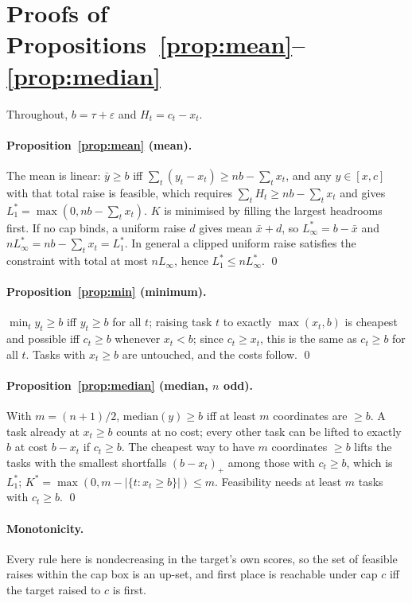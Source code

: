 \section{Proofs of Propositions~\ref{prop:mean}--\ref{prop:median}}
\label{app:proofs}

Throughout, $b=\tau+\varepsilon$ and $H_t=c_t-x_t$.

\paragraph{Proposition~\ref{prop:mean} (mean).} The mean is linear: $\bar y\ge b$ iff $\sum_t(y_t-x_t)\ge nb-\sum_tx_t$, and any $y\in[x,c]$ with that total raise is feasible, which requires $\sum_tH_t\ge nb-\sum_tx_t$ and gives $L_1^\ast=\max(0,nb-\sum_tx_t)$. $K$ is minimised by filling the largest headrooms first. If no cap binds, a uniform raise $d$ gives mean $\bar x+d$, so $L_\infty^\ast=b-\bar x$ and $nL_\infty^\ast=nb-\sum_tx_t=L_1^\ast$. In general a clipped uniform raise satisfies the constraint with total at most $nL_\infty$, hence $L_1^\ast\le nL_\infty^\ast$. \qed

\paragraph{Proposition~\ref{prop:min} (minimum).} $\min_ty_t\ge b$ iff $y_t\ge b$ for all $t$; raising task $t$ to exactly $\max(x_t,b)$ is cheapest and possible iff $c_t\ge b$ whenever $x_t<b$; since $c_t\ge x_t$, this is the same as $c_t\ge b$ for all $t$. Tasks with $x_t\ge b$ are untouched, and the costs follow. \qed

\paragraph{Proposition~\ref{prop:median} (median, $n$ odd).} With $m=(n+1)/2$, $\mathrm{median}(y)\ge b$ iff at least $m$ coordinates are $\ge b$. A task already at $x_t\ge b$ counts at no cost; every other task can be lifted to exactly $b$ at cost $b-x_t$ if $c_t\ge b$. The cheapest way to have $m$ coordinates $\ge b$ lifts the tasks with the smallest shortfalls $(b-x_t)_+$ among those with $c_t\ge b$, which is $L_1^\ast$; $K^\ast=\max(0,m-|\{t:x_t\ge b\}|)\le m$. Feasibility needs at least $m$ tasks with $c_t\ge b$. \qed

\paragraph{Monotonicity.} Every rule here is nondecreasing in the target's own scores, so the set of feasible raises within the cap box is an up-set, and first place is reachable under cap $c$ iff the target raised to $c$ is first.

